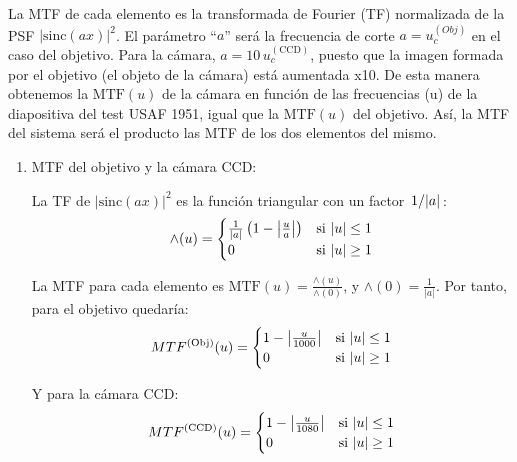 \documentclass{./packages/optica-article}
\newcommand{\sinc}{\textrm{sinc}}
\newcommand\MTF{\textrm{MTF}}
\begin{document}
\begin{enumerate}
	      La MTF de cada elemento es la transformada de Fourier (TF) normalizada de la PSF $|\sinc(ax)|^2$. El parámetro ``$a$'' será la frecuencia de corte $a=u_c^{(Obj)}$ en el caso del objetivo. Para la cámara, $a=10\, u_c^{(\textrm{CCD})}$, puesto que la imagen formada por el objetivo (el objeto de la cámara) está aumentada x10. De esta manera obtenemos la $\MTF(u)$ de la cámara en función de las frecuencias (u) de la diapositiva del test USAF 1951, igual que la $\MTF(u)$ del objetivo. Así, la MTF del sistema será el producto las MTF de los dos elementos del mismo.

	      \begin{enumerate}
		      \item MTF del objetivo y la cámara CCD:

		            La TF de $|\sinc(ax)|^2$ es la función triangular con un factor $\flatfrac{1}{|a|}$:
		            \begin{equation}
			            \wedge(u)=
			            \begin{cases}
				            \frac{1}{|a|}\left(1-\abs{\frac{u}{a}}\right) & \textrm{si   $|u| \leq 1$} \\
				            0                                             & \textrm{si  $|u| \geq 1$}
			            \end{cases}
		            \end{equation}

		            La MTF para cada elemento es $\MTF(u) = \frac{\wedge(u)}{\wedge(0)}$, y $\wedge(0) = \frac{1}{|a|}$. Por tanto, para el objetivo quedaría:
		            \begin{equation}
			            MTF^{(\textrm{Obj})}(u)=
			            \begin{cases}
				            1-\abs{\frac{u}{1000}} & \textrm{si   $|u| \leq 1$} \\
				            0                      & \textrm{si  $|u| \geq 1$}
			            \end{cases}
		            \end{equation}

		            Y para la cámara CCD:
		            \begin{equation}
			            MTF^{(\textrm{CCD})}(u)=
			            \begin{cases}
				            1-\abs{\frac{u}{1080}} & \textrm{si   $|u| \leq 1$} \\
				            0                      & \textrm{si  $|u| \geq 1$}
			            \end{cases}
		            \end{equation}


\end{enumerate}
\end{enumerate}
\end{document}
